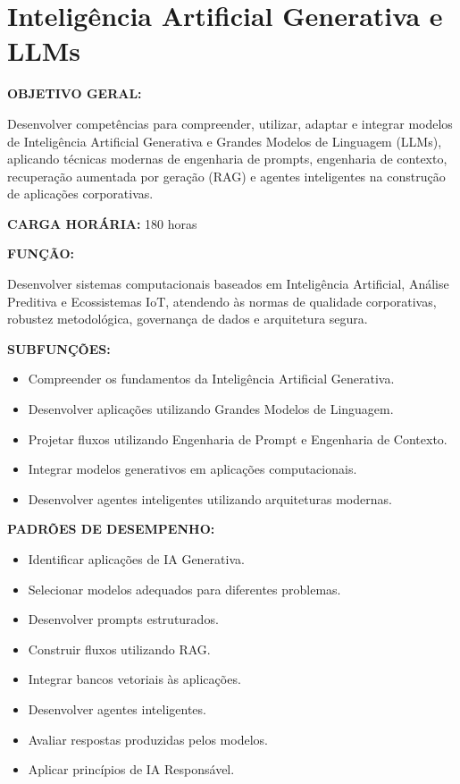 \section{Inteligência Artificial Generativa e LLMs}

\textbf{OBJETIVO GERAL:}

Desenvolver competências para compreender, utilizar, adaptar e integrar modelos de Inteligência Artificial Generativa e Grandes Modelos de Linguagem (LLMs), aplicando técnicas modernas de engenharia de prompts, engenharia de contexto, recuperação aumentada por geração (RAG) e agentes inteligentes na construção de aplicações corporativas.

\textbf{CARGA HORÁRIA:} 180 horas

\textbf{FUNÇÃO:}

Desenvolver sistemas computacionais baseados em Inteligência Artificial, Análise Preditiva e Ecossistemas IoT, atendendo às normas de qualidade corporativas, robustez metodológica, governança de dados e arquitetura segura.

\textbf{SUBFUNÇÕES:}

\begin{itemize}
\item Compreender os fundamentos da Inteligência Artificial Generativa.
\item Desenvolver aplicações utilizando Grandes Modelos de Linguagem.
\item Projetar fluxos utilizando Engenharia de Prompt e Engenharia de Contexto.
\item Integrar modelos generativos em aplicações computacionais.
\item Desenvolver agentes inteligentes utilizando arquiteturas modernas.
\end{itemize}

\textbf{PADRÕES DE DESEMPENHO:}

\begin{itemize}
\item Identificar aplicações de IA Generativa.
\item Selecionar modelos adequados para diferentes problemas.
\item Desenvolver prompts estruturados.
\item Construir fluxos utilizando RAG.
\item Integrar bancos vetoriais às aplicações.
\item Desenvolver agentes inteligentes.
\item Avaliar respostas produzidas pelos modelos.
\item Aplicar princípios de IA Responsável.
\end{itemize}

